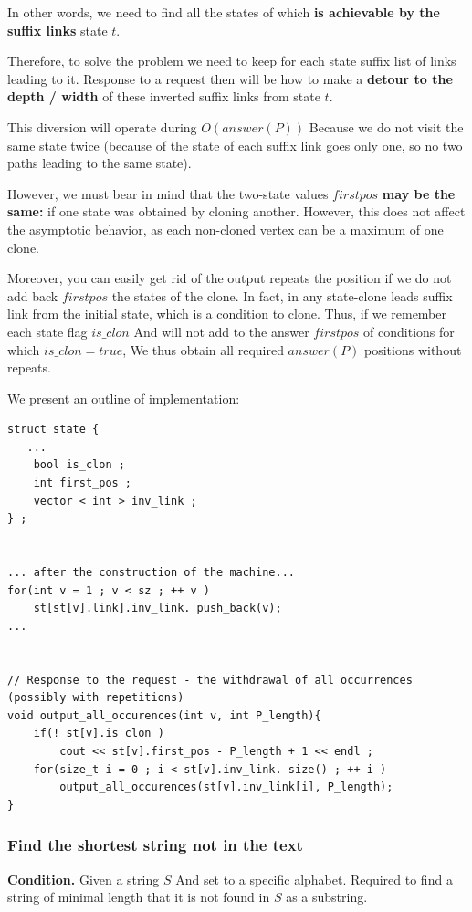 In other words, we need to find all the states of which \textbf{is achievable by the suffix links} state $t$.

Therefore, to solve the problem we need to keep for each state suffix list of links leading to it. Response to a request then will be how to make a \textbf{detour to the depth / width} of these inverted suffix links from state $t$.

This diversion will operate during $O (answer (P))$ Because we do not visit the same state twice (because of the state of each suffix link goes only one, so no two paths leading to the same state).

However, we must bear in mind that the two-state values $firstpos$ \textbf{may be the same:} if one state was obtained by cloning another. However, this does not affect the asymptotic behavior, as each non-cloned vertex can be a maximum of one clone.

Moreover, you can easily get rid of the output repeats the position if we do not add back $firstpos$ the states of the clone. In fact, in any state-clone leads suffix link from the initial state, which is a condition to clone. Thus, if we remember each state flag $is \_clon$ And will not add to the answer $firstpos$ of conditions for which $is \_clon = true$, We thus obtain all required $answer (P)$ positions without repeats.

We present an outline of implementation:

\begin{verbatim}
struct state {
   ...
    bool is_clon ;
    int first_pos ;
    vector < int > inv_link ;
} ;
 
 
... after the construction of the machine...
for(int v = 1 ; v < sz ; ++ v )
    st[st[v].link].inv_link. push_back(v);
...
 
 
// Response to the request - the withdrawal of all occurrences (possibly with repetitions)
void output_all_occurences(int v, int P_length){
    if(! st[v].is_clon )
        cout << st[v].first_pos - P_length + 1 << endl ;
    for(size_t i = 0 ; i < st[v].inv_link. size() ; ++ i )
        output_all_occurences(st[v].inv_link[i], P_length);
} 
\end{verbatim}
\subsubsection{ Find the shortest string not in the text }

\textbf{Condition.} Given a string $S$ And set to a specific alphabet. Required to find a string of minimal length that it is not found in $S$ as a substring.

